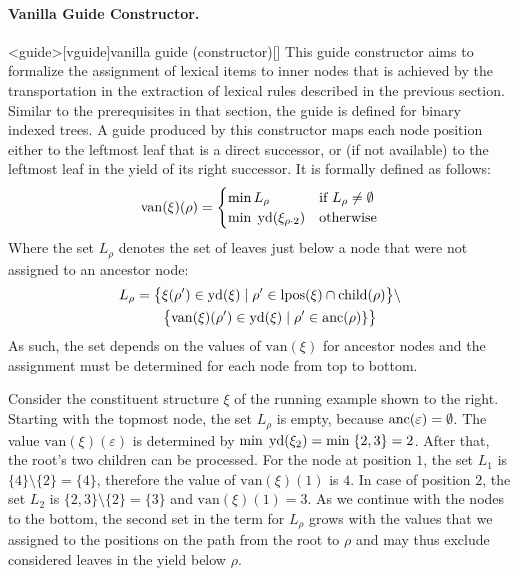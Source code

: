 \documentclass[../../document.tex]{subfiles}
\begin{document}
    \paragraph{Vanilla Guide Constructor.}<guide>[vguide]{vanilla guide (constructor)}[]
    This guide constructor aims to formalize the assignment of lexical items to inner nodes that is achieved by the transportation in the extraction of lexical  rules described in the previous section.
    Similar to the prerequisites in that section, the guide is defined for binary indexed trees.
    A guide produced by this constructor maps each node position either to the leftmost leaf that is a direct successor, or (if not available) to the leftmost leaf in the yield of its right successor.
    It is formally defined as follows:
    \[
    \mathrm{van}(\xi)(\rho) = \begin{cases}
        \min L_\rho & \text{if $L_\rho \neq \emptyset$} \\
        \min\;\operatorname{yd}(\xi_{\rho\cdot 2}) &\text{otherwise}
    \end{cases}
    \]
    Where the set \(L_\rho\) denotes the set of leaves just below a node that were not assigned to an ancestor node:
    \begin{align*}
        L_\rho &= \big\{\xi(\rho') \in \operatorname{yd}(\xi) \mid \rho' \in \operatorname{lpos}(\xi) \cap \operatorname{child}(\rho) \big\} \setminus \\
        &\qquad  \big\{\mathrm{van}(\xi)(\rho') \in \operatorname{yd}(\xi) \mid \rho' \in \operatorname{anc}(\rho)\} \big\}
    \end{align*}
    As such, the set depends on the values of \(\mathrm{van}(\xi)\) for ancestor nodes and the assignment must be determined for each node from top to bottom.

    \begin{wrapfigure}[6]{r}{.3\linewidth}
        \centering
        
    \end{wrapfigure}
    Consider the constituent structure \(\xi\) of the running example shown to the right.
    Starting with the topmost node, the set \(L_\rho\) is empty, because \(\operatorname{anc}(\varepsilon) = \emptyset\).
    The value \(\mathrm{van}(\xi)(\varepsilon)\) is determined by \(\min\;\operatorname{yd}(\xi_{2}) = \min\;\{2,3\} = 2\).
    After that, the root's two children can be processed.
    For the node at position \(1\), the set \(L_{1}\) is \(\{4\} \setminus \{2\} = \{4\}\), therefore the value of \(\mathrm{van}(\xi)(1)\) is \(4\).
    In case of position \(2\), the set \(L_{2}\) is \(\{2,3\} \setminus \{2\} = \{3\}\) and \(\mathrm{van}(\xi)(1)=3\).
    As we continue with the nodes to the bottom, the second set in the term for \(L_\rho\) grows with the values that we assigned to the positions on the path from the root to \(\rho\) and may thus exclude considered leaves in the yield below \(\rho\).
\end{document}
